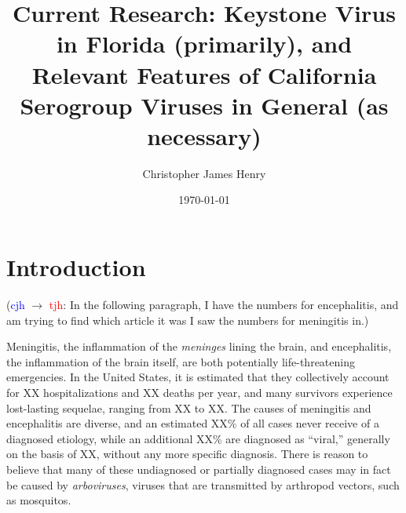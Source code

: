 \documentclass[12pt]{article}
\title%
{Current Research: Keystone Virus in Florida (primarily), and Relevant Features of California Serogroup Viruses in General (as necessary)}
\author%
{Christopher James Henry}
\date{\today}
\newcommand{\cjh}{\textcolor{blue}{cjh}}
\newcommand{\tjh}{\textcolor{red}{tjh}}
\newcommand{\msg}[3]{(#1 $\rightarrow$ #2: #3)}
\newcommand{\mct}[1]{\msg\cjh\tjh{#1}}
\newcommand{\mtc}[1]{\msg\tjh\cjh{#1}}
\begin{document}
    \titlepage
    


    \section{Introduction}
        \label{intro}

        \mct{In the following paragraph, I have the numbers for encephalitis, and am trying to find which article it was I saw the numbers for meningitis in.}

        Meningitis, the inflammation of the \textit{meninges} lining the brain, and encephalitis, the inflammation of the brain itself, are both potentially life-threatening emergencies. In the United States, it is estimated that they collectively account for XX hospitalizations and XX deaths per year, and many survivors experience lost-lasting sequelae, ranging from XX to XX. The causes of meningitis and encephalitis are diverse, and an estimated XX\% of all cases never receive of a diagnosed etiology, while an additional XX\% are diagnosed as ``viral,'' generally on the basis of XX, without any more specific diagnosis. There is reason to believe that many of these undiagnosed or partially diagnosed cases may in fact be caused by \textit{arboviruses}, viruses that are transmitted by arthropod vectors, such as mosquitos.
\end{document}
